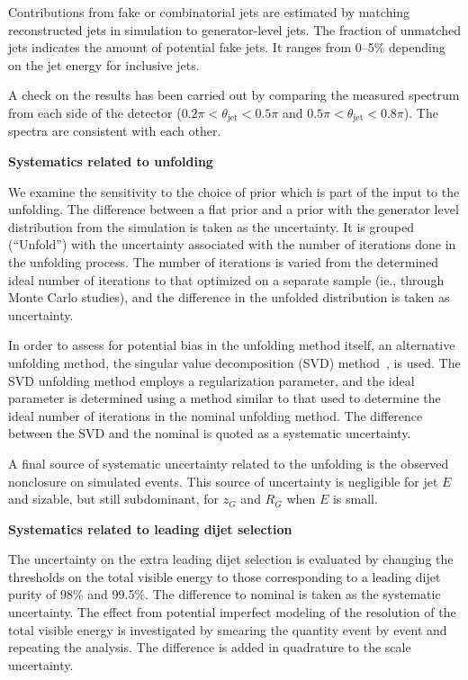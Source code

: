 \documentclass[aps,preprint,superscriptaddress,groupedaddress]{revtex4}  %
\newcommand{\zg}{\ensuremath{z_G}\xspace}
\newcommand{\Rg}{\ensuremath{R_G}\xspace}
\begin{document}
Contributions from fake or combinatorial jets are estimated by matching reconstructed jets in simulation to generator-level jets.  The fraction of unmatched jets indicates the amount of potential fake jets.  It ranges from 0--5\% depending on the jet energy for inclusive jets.

A check on the results has been carried out by comparing the measured spectrum from each side of the detector ($0.2\pi < \theta_\text{jet} < 0.5\pi$ and $0.5\pi < \theta_\text{jet} < 0.8\pi$).  The spectra are consistent with each other.

\textbf{Systematics related to unfolding}

We examine the sensitivity to the choice of prior which is part of the input to the unfolding.  The difference between a flat prior and a prior with the generator level distribution from the simulation is taken as the uncertainty.  It is grouped (``Unfold'') with the uncertainty associated with the number of iterations done in the unfolding process.  The number of iterations is varied from the determined ideal number of iterations to that optimized on a separate sample (ie., through Monte Carlo studies), and the difference in the unfolded distribution is taken as uncertainty.

In order to assess for potential bias in the unfolding method itself, an alternative unfolding method, the singular value decomposition (SVD) method~\cite{Hocker:1995kb}, is used.  The SVD unfolding method employs a regularization parameter, and the ideal parameter is determined using a method similar to that used to determine the ideal number of iterations in the nominal unfolding method.  The difference between the SVD and the nominal is quoted as a systematic uncertainty.

A final source of systematic uncertainty related to the unfolding is the observed nonclosure on simulated events.  This source of uncertainty is negligible for jet $E$ and sizable, but still subdominant, for \zg and \Rg when $E$ is small.

\textbf{Systematics related to leading dijet selection}

The uncertainty on the extra leading dijet selection is evaluated by changing the thresholds on the total visible energy to those corresponding to a leading dijet purity of 98\% and 99.5\%.  The difference to nominal is taken as the systematic uncertainty.  The effect from potential imperfect modeling of the resolution of the total visible energy is investigated by smearing the quantity event by event and repeating the analysis.  The difference is added in quadrature to the scale uncertainty.
\end{document}
